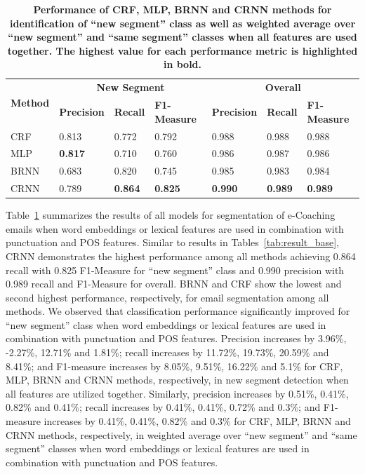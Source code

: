 \documentclass{amia}
\begin{document}
\begin{table}[ht]
\centering
\caption{\textbf{Performance of CRF, MLP, BRNN and CRNN methods for identification of ``new segment'' class as well as weighted average over ``new segment'' and ``same segment'' classes when all features are used together. The highest value for each performance metric
is highlighted in bold.}}
\label{tab:result_weighted_avg}
 \begin{tabular}{|l|l|l|l|l|l|l|}
  \hline
   \multirow{2}{*}{\textbf{Method}} & \multicolumn{3}{|c|}{\textbf{New Segment}} & \multicolumn{3}{|c|}{\textbf{Overall}} \\\cline{2-7}
   & \textbf{Precision}  & \textbf{Recall} & \textbf{F1-Measure} & \textbf{Precision}  & \textbf{Recall} & \textbf{F1-Measure} \\ \hline    
 CRF & 0.813 & 0.772 & 0.792 & 0.988 & 0.988 & 0.988 \\ \hline
 MLP & \textbf{0.817} & 0.710 & 0.760 & 0.986 & 0.987 & 0.986 \\ \hline
 BRNN & 0.683 & 0.820 & 0.745 & 0.985 & 0.983 & 0.984 \\ \hline
 CRNN & 0.789 & \textbf{0.864} & \textbf{0.825} & \textbf{0.990} & \textbf{0.989} & \textbf{0.989} \\ \hline
  \end{tabular}
\end{table}      

Table~\ref{tab:result_weighted_avg} summarizes the results of all models for segmentation of e-Coaching emails when word embeddings or lexical features are used in combination with punctuation and POS features. Similar to results in Tables~\ref{tab:result_base}, CRNN demonstrates the highest performance among all methods achieving 0.864 recall with 0.825 F1-Measure for ``new segment'' class and 0.990 precision with 0.989 recall and F1-Measure for overall. BRNN and CRF show the lowest and second highest performance, respectively, for email segmentation among all methods. We observed that classification performance significantly improved for ``new segment'' class when word embeddings or lexical features are used in combination with punctuation and POS features. Precision increases by 3.96\%, -2.27\%, 12.71\% and 1.81\%; recall increases by 11.72\%, 19.73\%, 20.59\% and 8.41\%; and F1-measure increases by 8.05\%, 9.51\%, 16.22\% and 5.1\% for CRF, MLP, BRNN and CRNN methods, respectively, in new segment detection when all features are utilized together. Similarly, precision increases by 0.51\%, 0.41\%, 0.82\% and 0.41\%; recall increases by 0.41\%, 0.41\%, 0.72\% and 0.3\%; and F1-measure increases by 0.41\%, 0.41\%, 0.82\% and 0.3\% for CRF, MLP, BRNN and CRNN methods, respectively, in weighted average over ``new segment'' and ``same segment'' classes when word embeddings or lexical features are used in combination with punctuation and POS features.\\
\end{document}
